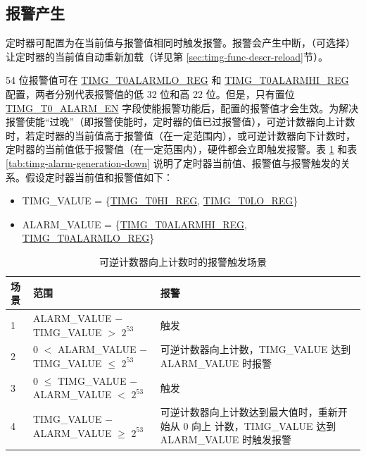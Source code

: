 \documentclass[main\_\_CN.tex]{subfiles}
\begin{document}
\subsection{报警产生}
定时器可配置为在当前值与报警值相同时触发报警。报警会产生中断，（可选择）让定时器的当前值自动重新加载（详见第 \ref{sec:timg-func-descr-reload}节）。

54 位报警值可在 \hyperref[regdesc:TIMGTXALARMLOREG]{TIMG\_T0ALARMLO\_REG} 和 \hyperref[regdesc:TIMGTXALARMHIREG]{TIMG\_T0ALARMHI\_REG} 配置，两者分别代表报警值的低 32 位和高 22 位。但是，只有置位 \hyperref[fielddesc:TIMGTXALARMEN]{TIMG\_T0\_ALARM\_EN} 字段使能报警功能后，配置的报警值才会生效。为解决报警使能“过晚”（即报警使能时，定时器的值已过报警值），可逆计数器向上计数时，若定时器的当前值高于报警值（在一定范围内），或可逆计数器向下计数时，定时器的当前值低于报警值（在一定范围内），硬件都会立即触发报警。表 \ref{tab:timg-alarm-generation-up} 和表 \ref{tab:timg-alarm-generation-down} 说明了定时器当前值、报警值与报警触发的关系。假设定时器当前值和报警值如下：

\begin{itemize}
    \item TIMG\_VALUE = \{\hyperref[regdesc:TIMGTXHIREG]{TIMG\_T0HI\_REG}, \hyperref[regdesc:TIMGTXLOREG]{TIMG\_T0LO\_REG}\}
    \item ALARM\_VALUE = \{\hyperref[regdesc:TIMGTXALARMHIREG]{TIMG\_T0ALARMHI\_REG}, \hyperref[regdesc:TIMGTXALARMLOREG]{TIMG\_T0ALARMLO\_REG}\}
\end{itemize}


\begin{table}[H]
\centering
\caption{可逆计数器向上计数时的报警触发场景}
\label{tab:timg-alarm-generation-up}

\begin{tabular}{|l|l|m{7cm}|}
\hline
\rowcolor{lightgray}
    \textbf{场景} & \textbf{范围} & \textbf{报警} \\\hline
     1 & ALARM\_VALUE $-$ TIMG\_VALUE $>$ $2^{53}$ & 触发 \\\hline
     2 & 0 $<$ ALARM\_VALUE $-$ TIMG\_VALUE $\leq$ $2^{53}$ & 可逆计数器向上计数，TIMG\_VALUE 达到 ALARM\_VALUE 时报警 \\\hline
     3 & 0 $\leq$ TIMG\_VALUE $-$ ALARM\_VALUE $<$ $2^{53}$ & 触发 \\\hline
     4 & TIMG\_VALUE $-$ ALARM\_VALUE $\geq$ $2^{53}$ & 可逆计数器向上计数达到最大值时，重新开始从 0 向上 计数，TIMG\_VALUE 达到 ALARM\_VALUE 时触发报警\\\hline

\end{tabular}
\end{table}
\end{document}
